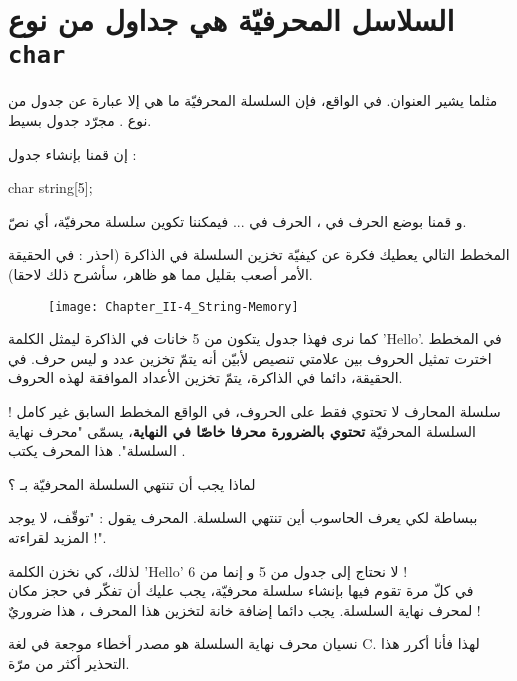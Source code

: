 \section{السلاسل المحرفيّة هي جداول من نوع \texttt{char}}

مثلما يشير العنوان. في الواقع، فإن السلسلة المحرفيّة ما هي إلا عبارة عن جدول من نوع
.
مجرّد جدول بسيط.

إن قمنا بإنشاء جدول :

\begin{Csource}
char string[5];
\end{Csource}

و قمنا بوضع الحرف
في
،
الحرف
في
...
فيمكننا تكوين سلسلة محرفيّة، أي نصّ.

المخطط التالي يعطيك فكرة عن كيفيّة تخزين السلسلة في الذاكرة (احذر : في الحقيقة الأمر أصعب بقليل مما هو ظاهر، سأشرح ذلك لاحقا).

\begin{figure}[H]
	\centering
	\texttt{[image: Chapter\_II-4\_String-Memory]}
\end{figure}

كما نرى فهذا جدول يتكون من 5 خانات في الذاكرة ليمثل الكلمة
'\textenglish{Hello}'.
في المخطط اخترت تمثيل الحروف بين علامتي تنصيص  لأبيّن أنه يتمّ تخزين عدد و ليس حرف. في الحقيقة، دائما في الذاكرة، يتمّ تخزين الأعداد الموافقة لهذه الحروف.

سلسلة المحارف لا تحتوي فقط على الحروف، في الواقع المخطط السابق غير كامل !
السلسلة المحرفيّة
\textbf{تحتوي بالضرورة محرفا خاصّا في النهاية}،
يسمّى "محرف نهاية السلسلة". هذا المحرف يكتب
.

\begin{question}
  لماذا يجب أن تنتهي السلسلة المحرفيّة بـ ؟
\end{question}

ببساطة لكي يعرف الحاسوب أين تنتهي السلسلة. المحرف
يقول : "توقّف، لا يوجد المزيد لقراءته !".

لذلك، كي نخزن الكلمة
'\textenglish{Hello}'
 لا نحتاج إلى جدول من 5
و إنما من 6 !\\
في كلّ مرة تقوم فيها بإنشاء سلسلة محرفيّة، يجب عليك أن تفكّر في حجز مكان لمحرف نهاية السلسلة. يجب دائما إضافة خانة لتخزين هذا المحرف
،
هذا ضروريٌ !

نسيان محرف نهاية السلسلة
هو مصدر أخطاء موجعة في لغة
\textenglish{C}.
لهذا فأنا أكرر هذا التحذير أكثر من مرّة.

